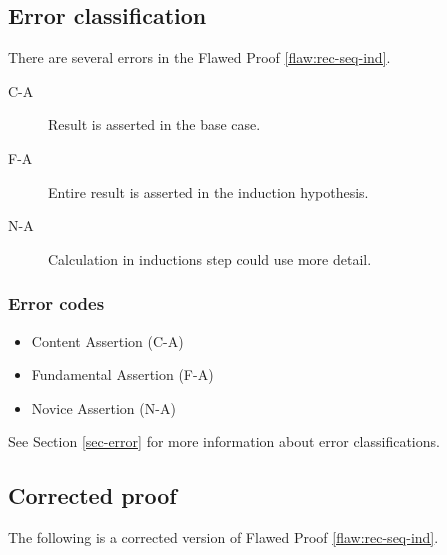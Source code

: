 \clearpage
\subsection{Error classification}

There are several errors
 in the Flawed Proof \ref{flaw:rec-seq-ind}. 

 
 \begin{description}
 	\item[C-A] Result is asserted in the base case.	
 	\item[F-A] Entire result is asserted in the induction hypothesis.
 	\item[N-A] Calculation in inductions step could use more detail.
 \end{description}

 
\subsubsection{Error codes}
\begin{itemize}
	\item 	 Content Assertion (C-A)
	\item    Fundamental Assertion (F-A)
	\item    Novice Assertion (N-A)
\end{itemize}
See Section \ref{sec-error} for more information about error classifications.

\clearpage
\subsection{Corrected proof}

The following is a corrected version of Flawed Proof \ref{flaw:rec-seq-ind}. 

